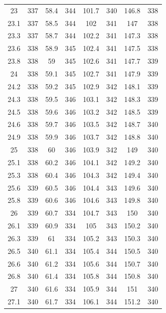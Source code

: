 \documentclass[12pt]{ctexart}
\numberwithin{equation}{section}
\begin{document}
\begin{longtable}{cc|cc|cc|cc}
23  &  337  &  58.4  &  344  &  101.7  &  340  &  146.8  &  338  \\
23.1  &  337  &  58.5  &  344  &  102  &  341  &  147  &  338  \\
23.3  &  337  &  58.7  &  344  &  102.2  &  341  &  147.3  &  338  \\
23.6  &  338  &  58.9  &  345  &  102.4  &  341  &  147.5  &  338  \\
23.8  &  338  &  59  &  345  &  102.6  &  341  &  147.7  &  339  \\
24  &  338  &  59.1  &  345  &  102.7  &  341  &  147.9  &  339  \\
24.2  &  338  &  59.2  &  345  &  102.9  &  342  &  148.1  &  339  \\
24.3  &  338  &  59.5  &  346  &  103.1  &  342  &  148.3  &  339  \\
24.5  &  338  &  59.6  &  346  &  103.2  &  342  &  148.5  &  339  \\
24.6  &  338  &  59.7  &  346  &  103.5  &  342  &  148.7  &  340  \\
24.9  &  338  &  59.9  &  346  &  103.7  &  342  &  148.8  &  340  \\
25  &  338  &  60  &  346  &  103.9  &  342  &  149  &  340  \\
25.1  &  338  &  60.2  &  346  &  104.1  &  342  &  149.2  &  340  \\
25.3  &  338  &  60.4  &  346  &  104.3  &  342  &  149.4  &  340  \\
25.6  &  339  &  60.5  &  346  &  104.4  &  343  &  149.6  &  340  \\
25.8  &  339  &  60.6  &  346  &  104.6  &  343  &  149.8  &  340  \\
26  &  339  &  60.7  &  334  &  104.7  &  343  &  150  &  340  \\
26.1  &  339  &  60.9  &  334  &  105  &  343  &  150.2  &  340  \\
26.3  &  339  &  61  &  334  &  105.2  &  343  &  150.3  &  340  \\
26.5  &  340  &  61.1  &  334  &  105.4  &  344  &  150.5  &  340  \\
26.6  &  340  &  61.2  &  334  &  105.6  &  344  &  150.7  &  340  \\
26.8  &  340  &  61.4  &  334  &  105.8  &  344  &  150.8  &  340  \\
27  &  340  &  61.6  &  334  &  105.9  &  344  &  151  &  340  \\
27.1  &  340  &  61.7  &  334  &  106.1  &  344  &  151.2  &  340  \\

\end{longtable}
\end{document}

